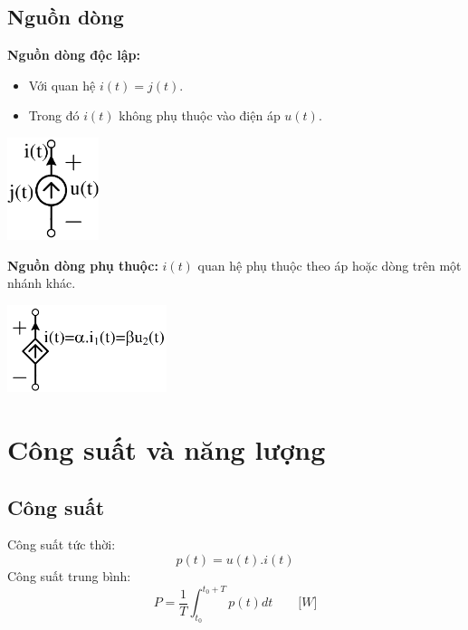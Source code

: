 \subsection{Nguồn dòng}
\textbf{Nguồn dòng độc lập:} 
\begin{itemize}
  \item Với quan hệ $i(t)=j(t)$.
  \item Trong đó $i(t)$ không phụ thuộc vào điện áp $u(t)$.
\end{itemize}
\begin{center}
  \includegraphics[width=0.2\textwidth]{./image/11.png}
\end{center}
\textbf{Nguồn dòng phụ thuộc:} $i(t)$ quan hệ phụ thuộc theo áp hoặc dòng trên một nhánh khác.
\begin{center}
  \includegraphics[width=0.35\textwidth]{./image/12.png}
\end{center}
\section{Công suất và năng lượng}
\subsection{Công suất}
\noindent Công suất tức thời: 
\begin{equation}
  p(t)=u(t).i(t)
\end{equation}
Công suất trung bình: 
\begin{equation}
  P= \frac{1}{T}\int_{t_0}^{t_0 + T} p(t)dt \qquad \lbrack W\rbrack
\end{equation}
